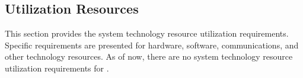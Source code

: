 \subsection{Utilization Resources}
\label{lab:ssec_TechnologyResourceUtilization}
This section provides the system technology resource utilization requirements.
Specific requirements are presented for hardware, software, communications, and other technology resources.
As of now, there are no system technology resource utilization requirements for \ThisSys.
